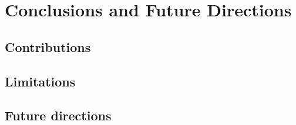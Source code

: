 
\chapter{Conclusions and Future Directions}\doublespacing %

\label{Chapter6}


\section{Contributions}

\section{Limitations}

\section{Future directions}
